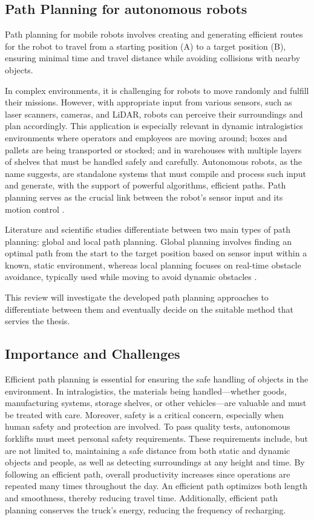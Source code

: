 \subsection{Path Planning for autonomous robots}

Path planning for mobile robots involves creating and generating efficient routes 
for the robot to travel from a starting position (A) to a target position (B), 
ensuring minimal time and travel distance while avoiding collisions with nearby objects.

In complex environments, it is challenging for robots to move randomly and fulfill 
their missions. However, with appropriate input from various sensors, such as laser 
scanners, cameras, and LiDAR, robots can perceive their surroundings and plan 
accordingly. This application is especially relevant in dynamic intralogistics 
environments where operators and employees are moving around; boxes and pallets are 
being transported or stocked; and in warehouses with multiple layers of shelves that 
must be handled safely and carefully. Autonomous robots, as the name suggests, are 
standalone systems that must compile and process such input and generate, with the 
support of powerful algorithms, efficient paths. Path planning serves as the crucial 
link between the robot’s sensor input and its motion control \cite{R10}.

Literature and scientific studies differentiate between two main types of path planning: 
global and local path planning. Global planning involves finding an optimal path from 
the start to the target position based on sensor input within a known, static environment, 
whereas local planning focuses on real-time obstacle avoidance, typically used while 
moving to avoid dynamic obstacles \cite{R11}.

This review will investigate the developed path planning approaches to 
differentiate between them and eventually decide on the suitable method that servies the thesis.

\subsection{Importance and Challenges}

Efficient path planning is essential for ensuring the safe handling of objects in the environment. 
In intralogistics, the materials being handled—whether goods, manufacturing systems, storage 
shelves, or other vehicles—are valuable and must be treated with care. Moreover, safety is a 
critical concern, especially when human safety and protection are involved. To pass quality 
tests, autonomous forklifts must meet personal safety requirements. These requirements include, 
but are not limited to, maintaining a safe distance from both static and dynamic objects and 
people, as well as detecting surroundings at any height and time. By following an efficient 
path, overall productivity increases since operations are repeated many times throughout the 
day. An efficient path optimizes both length and smoothness, thereby reducing travel time. 
Additionally, efficient path planning conserves the truck's energy, reducing the frequency of recharging.

